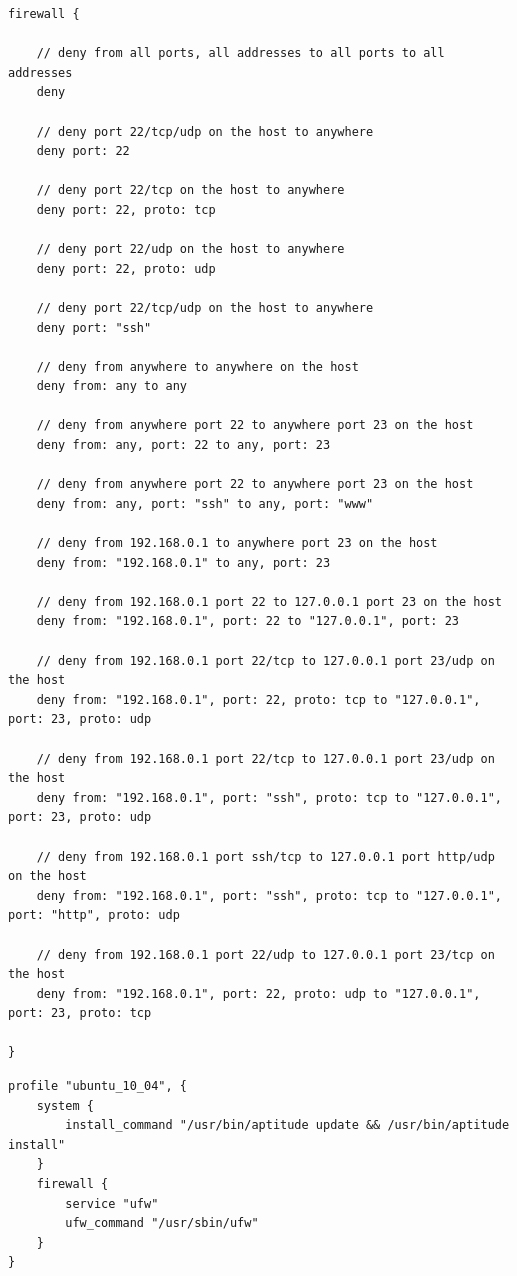 \begin{lstlisting}[style=Java,label=lst:firewall_deny_script,caption=Firewall Deny Rules Script]
firewall {

    // deny from all ports, all addresses to all ports to all addresses
    deny

    // deny port 22/tcp/udp on the host to anywhere
    deny port: 22

    // deny port 22/tcp on the host to anywhere
    deny port: 22, proto: tcp

    // deny port 22/udp on the host to anywhere
    deny port: 22, proto: udp

    // deny port 22/tcp/udp on the host to anywhere
    deny port: "ssh"

    // deny from anywhere to anywhere on the host
    deny from: any to any

    // deny from anywhere port 22 to anywhere port 23 on the host
    deny from: any, port: 22 to any, port: 23

    // deny from anywhere port 22 to anywhere port 23 on the host
    deny from: any, port: "ssh" to any, port: "www"

    // deny from 192.168.0.1 to anywhere port 23 on the host
    deny from: "192.168.0.1" to any, port: 23

    // deny from 192.168.0.1 port 22 to 127.0.0.1 port 23 on the host
    deny from: "192.168.0.1", port: 22 to "127.0.0.1", port: 23

    // deny from 192.168.0.1 port 22/tcp to 127.0.0.1 port 23/udp on the host
    deny from: "192.168.0.1", port: 22, proto: tcp to "127.0.0.1", port: 23, proto: udp

    // deny from 192.168.0.1 port 22/tcp to 127.0.0.1 port 23/udp on the host
    deny from: "192.168.0.1", port: "ssh", proto: tcp to "127.0.0.1", port: 23, proto: udp

    // deny from 192.168.0.1 port ssh/tcp to 127.0.0.1 port http/udp on the host
    deny from: "192.168.0.1", port: "ssh", proto: tcp to "127.0.0.1", port: "http", proto: udp

    // deny from 192.168.0.1 port 22/udp to 127.0.0.1 port 23/tcp on the host
    deny from: "192.168.0.1", port: 22, proto: udp to "127.0.0.1", port: 23, proto: tcp

}
\end{lstlisting}

\pagebreak

\begin{lstlisting}[style=Java,label=lst:firewall_ubuntu_profile,caption=Firewall Example Ubuntu Profile]
profile "ubuntu_10_04", {
    system {
        install_command "/usr/bin/aptitude update && /usr/bin/aptitude install"
    }
    firewall {
        service "ufw"
        ufw_command "/usr/sbin/ufw"
    }
}
\end{lstlisting}

